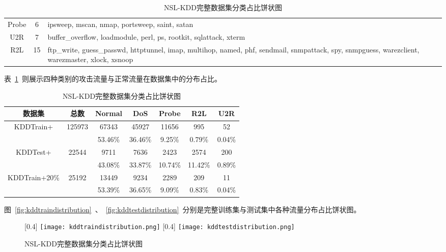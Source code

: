 \begin{table}[h]
\begin{table}[h]
\begin{table}[h]
\begin{tabularx}{\textwidth}{@{}ccX@{}}
		Probe                             & 6                                 & ipsweep, mscan, nmap, portsweep, saint, satan                                                                                                    \\
		U2R                               & 7                                 & buffer\_overflow, loadmodule, perl, ps, rootkit, sqlattack, xterm                                                                                \\
		R2L                               & 15                                & ftp\_write, guess\_passwd, httptunnel, imap, multihop, named, phf, sendmail, snmpattack, spy, snmpguess, warezclient, warezmaster, xlock, xsnoop \\
		\bottomrule
	\end{tabularx}
\end{table}
表~\ref{tab:kdd_distribution}~则展示四种类别的攻击流量与正常流量在数据集中的分布占比。
\begin{table}[h]
	\caption{每种攻击类型的数据分布}
	\label{tab:kdd_distribution}
	\centering
	\begin{tabular}{ccccccc}
		\toprule
		\textbf{数据集}                & \textbf{总数}           & \textbf{Normal} & \textbf{DoS} & \textbf{Probe} & \textbf{R2L} & \textbf{U2R} \\
		\midrule
		\multirow{2}{*}{KDDTrain+}     & \multirow{2}{*}{125973} & 67343           & 45927        & 11656          & 995          & 52           \\
		                               &                         & 53.46\%         & 36.46\%      & 9.25\%         & 0.79\%       & 0.04\%       \\
		\multirow{2}{*}{KDDTest+}      & \multirow{2}{*}{22544}  & 9711            & 7636         & 2423           & 2574         & 200          \\
		                               &                         & 43.08\%         & 33.87\%      & 10.74\%        & 11.42\%      & 0.89\%       \\
		\multirow{2}{*}{KDDTrain+20\%} & \multirow{2}{*}{25192}  & 13449           & 9234         & 2289           & 209          & 11           \\
		                               &                         & 53.39\%         & 36.65\%      & 9.09\%         & 0.83\%       & 0.04\%       \\
		\bottomrule
	\end{tabular}
\end{table}
图~\ref{fig:kddtraindistribution}~、~\ref{fig:kddtestdistribution}~分别是完整训练集与测试集中各种流量分布占比饼状图。
\begin{figure}[htbp]
	\centering
	[0.4\textwidth]{
		\texttt{[image: kddtraindistribution.png]}
	}
	\hspace{36pt}
	[0.4\textwidth]{
		\texttt{[image: kddtestdistribution.png]}
	}
	\caption{NSL-KDD完整数据集分类占比饼状图}
\end{figure}


\end{table}
\end{table}
